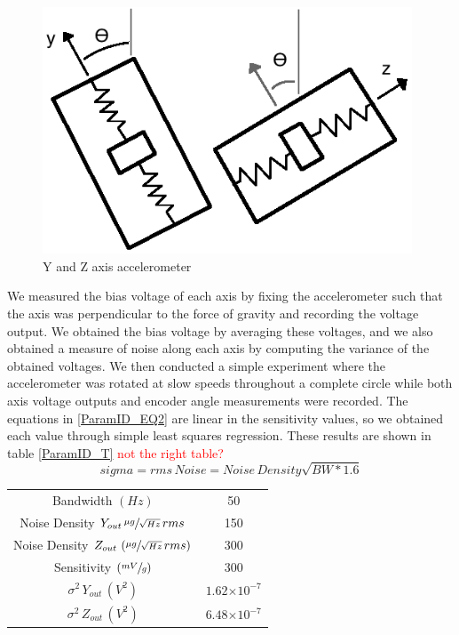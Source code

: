 \documentclass{article}
\newcommand{\xxx}[1]{\textcolor{red}{#1}}
\theoremstyle{plain}
\theoremstyle{definition}
\theoremstyle{remark}
\providecommand{\e}[1]{\ensuremath{\times 10^{#1}}}
\begin{document}
\begin{figure}
\begin{center}
\includegraphics[width = 11cm]{Accelerometer_Cartoon.png}
\caption{Y and Z axis accelerometer}
\label{Accel_cartoon}
\end{center}
\end{figure}

We measured the bias voltage of each axis by fixing the accelerometer such that the axis was perpendicular to the force of gravity and recording the voltage output.  We obtained the bias voltage by averaging these voltages, and we also obtained a measure of noise along each axis by computing the variance of the obtained voltages.  We then conducted a simple experiment where the accelerometer was rotated at slow speeds throughout a complete circle while both axis voltage outputs and encoder angle measurements were recorded.  The equations in \ref{ParamID_EQ2} are linear in the sensitivity values, so we obtained each value through simple least squares regression.  These results are shown in table \ref{ParamID_T} \xxx{not the right table?} \\


$$sigma = rms \, Noise = Noise \, Density \sqrt{BW * 1.6} $$

\begin{table}
\begin{center}
	\begin{tabular}{|c|c|}
		\hline
		Bandwidth $(Hz)$ & 50 \\ 
		Noise Density $Y_{out} \, \sfrac{\mu g}{\sqrt{Hz}} \, rms$ & 150 \\ 
		Noise Density $Z_{out} \, \left(\sfrac{\mu g}{\sqrt{Hz}} \, rms\right)$ & 300 \\ 
		Sensitivity $\left( \sfrac{mV}{g} \right)$ & 300 \\  
		$\sigma^2 \,Y_{out} \, (V^2)$ & $1.62 \e{-7}$ \\ 
		$\sigma^2 \,Z_{out} \, (V^2)$ & $6.48 \e{-7}$ \\[0.1cm] \hline
		
	\end{tabular}
\label{ParamID_AccelT}
\end{center}
\end{table}
\end{document}
